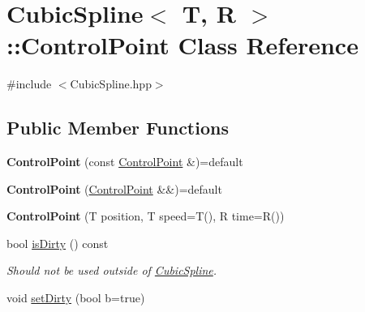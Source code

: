 \hypertarget{class_cubic_spline_1_1_control_point}{\section{Cubic\+Spline$<$ T, R $>$\+:\+:Control\+Point Class Reference}
\label{class_cubic_spline_1_1_control_point}
}


{\ttfamily \#include $<$Cubic\+Spline.\+hpp$>$}

\subsection*{Public Member Functions}
\begin{DoxyCompactItemize}
\item 
\hypertarget{class_cubic_spline_1_1_control_point_af599da00be5d4c064ff8f014147aa97e}{{\bfseries Control\+Point} (const \hyperlink{class_cubic_spline_1_1_control_point}{Control\+Point} \&)=default}\label{class_cubic_spline_1_1_control_point_af599da00be5d4c064ff8f014147aa97e}

\item 
\hypertarget{class_cubic_spline_1_1_control_point_a60e070a59f5e4e952dfde49e273f6c29}{{\bfseries Control\+Point} (\hyperlink{class_cubic_spline_1_1_control_point}{Control\+Point} \&\&)=default}\label{class_cubic_spline_1_1_control_point_a60e070a59f5e4e952dfde49e273f6c29}

\item 
\hypertarget{class_cubic_spline_1_1_control_point_abe4fb6190bbabd312f9ed5148edd1b79}{{\bfseries Control\+Point} (T position, T speed=T(), R time=R())}\label{class_cubic_spline_1_1_control_point_abe4fb6190bbabd312f9ed5148edd1b79}

\item 
\hypertarget{class_cubic_spline_1_1_control_point_a7b40d5fd4c424527bc3f14b684d2220e}{bool \hyperlink{class_cubic_spline_1_1_control_point_a7b40d5fd4c424527bc3f14b684d2220e}{is\+Dirty} () const }\label{class_cubic_spline_1_1_control_point_a7b40d5fd4c424527bc3f14b684d2220e}

\begin{DoxyCompactList}\small\item\em Should not be used outside of \hyperlink{class_cubic_spline}{Cubic\+Spline}. \end{DoxyCompactList}\item 
\hypertarget{class_cubic_spline_1_1_control_point_a4ee3d17f52f9ca2fc2e3f6e5f1002993}{void \hyperlink{class_cubic_spline_1_1_control_point_a4ee3d17f52f9ca2fc2e3f6e5f1002993}{set\+Dirty} (bool b=true)}\label{class_cubic_spline_1_1_control_point_a4ee3d17f52f9ca2fc2e3f6e5f1002993}


\end{DoxyCompactItemize}
